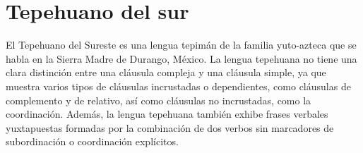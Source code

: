 \section*{Tepehuano del sur}

\noindent El Tepehuano del Sureste es una lengua tepimán de la familia yuto-azteca que se habla en la Sierra Madre de Durango, México. La lengua tepehuana no tiene una clara distinción entre una cláusula compleja y una cláusula simple, ya que muestra varios tipos de cláusulas incrustadas o dependientes, como cláusulas de complemento y de relativo, así como cláusulas no incrustadas, como la coordinación. Además, la lengua tepehuana también exhibe frases verbales yuxtapuestas formadas por la combinación de dos verbos sin marcadores de subordinación o coordinación explícitos. \vspace{0.5cm}

